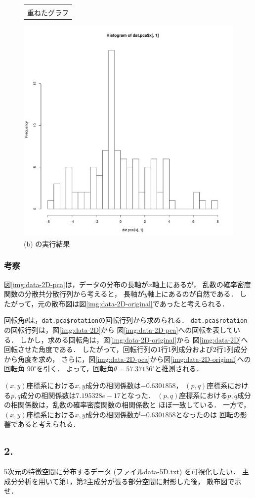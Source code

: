 \documentclass{jsarticle}
\begin{document}
\begin{figure}[b]
\begin{minipage}{\hsize}
\begin{tabular}{c}
\begin{minipage}{0.25\hsize}
				\caption{3つの散布図を\\重ねたグラフ}
				\label{img:data-2D-mix}
			\end{minipage}
		\end{tabular}
	\end{minipage}
\end{figure}

\begin{figure}[b]
	\centering
	\includegraphics[width=.25\hsize]{img/data-2d-hist.pdf}
	\caption{(b) の実行結果}
	\label{img:data-2D-hist}
\end{figure}

\subsubsection*{考察}
図\ref{img:data-2D-pca}は，データの分布の長軸が$x$軸上にあるが，
乱数の確率密度関数の分散共分散行列から考えると，
長軸が$y$軸上にあるのが自然である．
したがって，元の散布図は図\ref{img:data-2D-original}であったと考えられる．

回転角$\theta$は，\verb|dat.pca$rotation|の回転行列から求められる．
\verb|dat.pca$rotation|の回転行列は，図\ref{img:data-2D}から
図\ref{img:data-2D-pca}への回転を表している．
しかし，求める回転角は，図\ref{img:data-2D-original}から
図\ref{img:data-2D}へ回転させた角度である．
したがって，回転行列の1行1列成分および2行1列成分から角度を求め，
さらに，図\ref{img:data-2D-pca}から図\ref{img:data-2D-original}への回転角
$90^\circ$を引く．
よって，回転角$\theta=57.37136^\circ$と推測される．

$(x,y)$座標系における$x,y$成分の相関係数は$-0.6301858$，
$(p,q)$座標系における$p,q$成分の相関係数は$7.195328e\!-\!17$となった．
$(p,q)$座標系における$p,q$成分の相関係数は，乱数の確率密度関数の相関係数と
ほぼ一致している．
一方で，$(x,y)$座標系における$x,y$成分の相関係数が$-0.6301858$となったのは
回転の影響であると考えられる．

\subsection*{2.}
5次元の特徴空間に分布するデータ (ファイルdata-5D.txt) を可視化したい．
主成分分析を用いて第1，第2主成分が張る部分空間に射影した後，
散布図で示せ．
\end{document}
